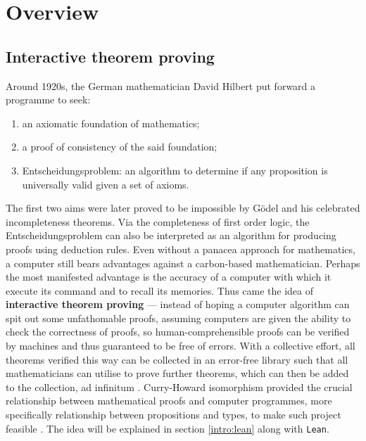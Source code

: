 \documentclass{report}
\theoremstyle{definition}
\begin{document}
\tableofcontents

\chapter{Overview}
\section{Interactive theorem proving}
Around 1920s, the German mathematician David Hilbert put forward a programme to seek:
\begin{enumerate}
  \item an axiomatic foundation of mathematics;
  \item a proof of consistency of the said foundation;
  \item Entscheidungsproblem: an algorithm to determine if any proposition is universally valid given a set of axioms.
\end{enumerate}
The first two aims were later proved to be impossible by Gödel and his celebrated incompleteness theorems. Via the completeness of first order logic, the Entscheidungsproblem can also be interpreted as an algorithm for producing proofs using deduction rules. Even without a panacea approach for mathematics, a computer still bears advantages against a carbon-based mathematician. Perhaps the most manifested advantage is the accuracy of a computer with which it execute its command and to recall its memories. Thus came the idea of {\bf interactive theorem proving} --- instead of hoping a computer algorithm can spit out some unfathomable proofs, assuming computers are given the ability to check the correctness of proofs, so human-comprehensible proofs can be verified by machines and thus guaranteed to be free of errors. With a collective effort, all theorems verified this way can be collected in an error-free library such that all mathematicians can utilise to prove further theorems, which can then be added to the collection, ad infinitum \cite{boyer1994qed}. Curry-Howard isomorphism provided the crucial relationship between mathematical proofs and computer programmes, more specifically relationship between propositions and types, to make such project feasible \cite{kennedy2011set}. The idea will be explained in section \ref{intro:lean} along with {\tt \small Lean}. 
\end{document}
